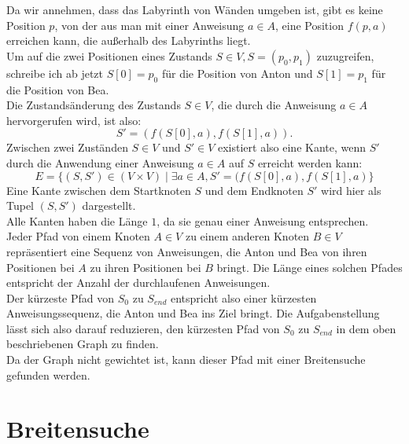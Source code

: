 \documentclass[a4paper,10pt,ngerman]{scrartcl}
\begin{document}
    Da wir annehmen, dass das Labyrinth von Wänden umgeben ist, gibt es keine Position $p$, von der aus man mit einer Anweisung $a \in A$, eine Position $f(p,a)$ erreichen kann, die außerhalb des Labyrinths liegt. \\
    Um auf die zwei Positionen eines Zustands $S \in V, S = (p_0, p_1)$ zuzugreifen, schreibe ich ab jetzt $S[0] = p_0$ für die Position von Anton und $S[1] = p_1$ für die Position von Bea.\\
    Die Zustandsänderung des Zustands $S \in V$, die durch die Anweisung $a \in A$ hervorgerufen wird, ist also: \[S' = (f(S[0], a), f(S[1], a)).\] Zwischen zwei Zuständen $S \in V$ und $S' \in V$ existiert also eine Kante, wenn $S'$ durch die Anwendung einer Anweisung $a \in A$ auf $S$ erreicht werden kann:
    \[E = \{(S, S') \in (V \times V) \mid \exists a \in A, S' = (f(S[0], a), f(S[1], a)\}\]
    Eine Kante zwischen dem Startknoten $S$ und dem Endknoten $S'$ wird hier als Tupel $(S, S')$ dargestellt.\\
    Alle Kanten haben die Länge $1$, da sie genau einer Anweisung entsprechen. \\
    Jeder Pfad von einem Knoten $A \in V$ zu einem anderen Knoten $B \in V$ repräsentiert eine Sequenz von Anweisungen, die Anton und Bea von ihren Positionen bei $A$ zu ihren Positionen bei $B$ bringt.
    Die Länge eines solchen Pfades entspricht der Anzahl der durchlaufenen Anweisungen.\\
    Der kürzeste Pfad von $S_0$ zu $S_{end}$ entspricht also einer kürzesten Anweisungssequenz, die Anton und Bea ins Ziel bringt. Die Aufgabenstellung lässt sich also darauf reduzieren, den kürzesten Pfad von $S_0$ zu $S_{end}$ in dem oben beschriebenen Graph zu finden. \\
    Da der Graph nicht gewichtet ist, kann dieser Pfad mit einer Breitensuche gefunden werden.\\


    \section{Breitensuche}
\end{document}
